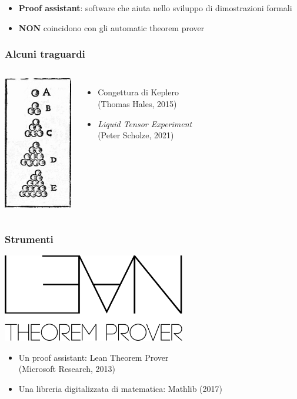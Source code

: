 \documentclass{beamer}
\begin{document}
\begin{frame}
  \begin{itemize}
    \setlength\itemsep{4em} \pause
    \item \textbf{Proof assistant}: software che aiuta nello sviluppo di dimostrazioni formali \pause
    \item \textbf{NON} coincidono con gli automatic theorem prover
  \end{itemize}

\end{frame}

\begin{frame}
  \frametitle{Alcuni traguardi} \pause

  \begin{columns}[onlytextwidth,T]
    \column{30mm}
    \includegraphics[width=30mm]{kepler.jpg}

    \column{\dimexpr\linewidth-30mm-5mm}
    \begin{itemize}
      \setlength\itemsep{4em}
      \item Congettura di Keplero\\(Thomas Hales, 2015) \pause
      \item \textit{Liquid Tensor Experiment}\\(Peter Scholze, 2021)
    \end{itemize}

  \end{columns}

\end{frame}

\begin{frame}
  \frametitle{Strumenti}
  \begin{center}\includegraphics[width=0.6\textwidth]{lean.png}\end{center}
  \begin{itemize}
  \setlength\itemsep{2em}
  \item Un proof assistant: Lean Theorem Prover\\(Microsoft Research, 2013) \pause
  \item Una libreria digitalizzata di matematica: Mathlib (2017)
  \end{itemize}
\end{frame}
\end{document}
